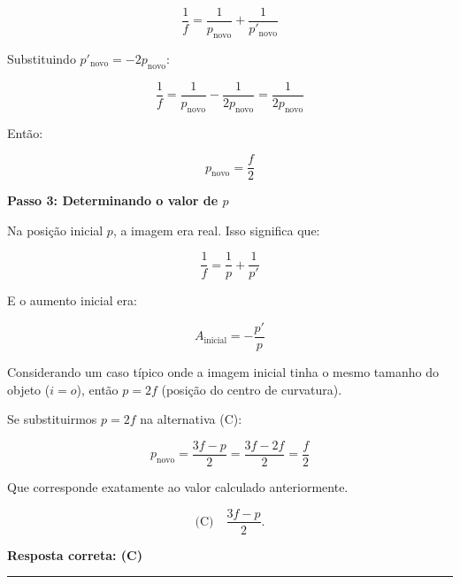\documentclass[a4paper,12pt]{article}
\begin{document}
\begin{flushleft}
\begin{equation}
\frac{1}{f} = \frac{1}{p_{\text{novo}}} + \frac{1}{p'_{\text{novo}}}
\end{equation}

Substituindo $p'_{\text{novo}} = -2p_{\text{novo}}$:

\begin{equation}
\frac{1}{f} = \frac{1}{p_{\text{novo}}} - \frac{1}{2p_{\text{novo}}} = \frac{1}{2p_{\text{novo}}}
\end{equation}

Então:

\begin{equation}
p_{\text{novo}} = \frac{f}{2}
\end{equation}

\textbf{Passo 3: Determinando o valor de $p$}

Na posição inicial $p$, a imagem era real. Isso significa que:

\begin{equation}
\frac{1}{f} = \frac{1}{p} + \frac{1}{p'}
\end{equation}

E o aumento inicial era:

\begin{equation}
A_{\text{inicial}} = -\frac{p'}{p}
\end{equation}

Considerando um caso típico onde a imagem inicial tinha o mesmo tamanho do objeto ($i=o$), então $p = 2f$ (posição do centro de curvatura).

Se substituirmos $p=2f$ na alternativa (C):

\begin{equation}
p_{\text{novo}} = \frac{3f-p}{2} = \frac{3f-2f}{2} = \frac{f}{2}
\end{equation}

Que corresponde exatamente ao valor calculado anteriormente.

\[
\boxed{\text{(C)} \quad \dfrac{3f-p}{2}}.
\]


\textbf{Resposta correta: \colorbox{green!50}{(C)}}

\end{flushleft}
\noindent\rule{\linewidth}{0.6pt}\\
\end{document}
